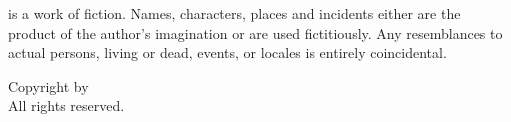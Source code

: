 \begin{flushleft}

\textit{\thetitle} is a work of fiction. Names, characters, places and incidents either are the product of the author's imagination or are used fictitiously. Any resemblances to actual persons, living or dead, events, or locales is entirely coincidental.
\vspace{2\baselineskip}

Copyright {\textcopyright} {\theyear} by {\theauthor}\\
All rights reserved.
\vspace{2\baselineskip}


\end{flushleft}